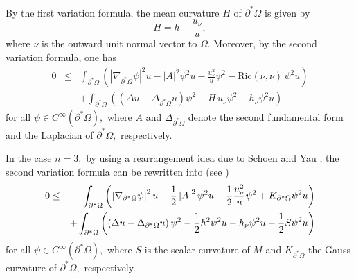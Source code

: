 \documentclass[10pt,a4paper]{amsart}
\numberwithin{equation}{section}
\begin{document}
By the first variation formula,
the mean curvature $H$ of $\partial ^{\ast }\Omega$ is given by
\begin{equation}
H=h-\frac{u_{\nu }}{u},  \label{a2}
\end{equation}
where $\nu$ is the outward unit normal vector to $\Omega.$
Moreover, by the second variation formula, one has
\begin{eqnarray*} 
0 &\leq &\int_{\partial ^{\ast }\Omega }\left( \left\vert \nabla _{\partial ^{\ast }\Omega 
}\psi \right\vert ^{2}u-\left\vert A\right\vert ^{2}\psi ^{2}u-
\frac{u_{\nu }^{2}}{u}\psi ^{2}-\mathrm{Ric}(\nu, \nu)\,\psi
^{2}u\right) \\
&&+\int_{\partial ^{\ast }\Omega }\left( \left( \Delta u-\Delta _{\partial
^{\ast }\Omega }u\right) \psi ^{2}-H\,u_{\nu}\psi ^{2}-h_{\nu }\psi
^{2}u\right)
\end{eqnarray*}
for all $\psi \in C^{\infty }\left( \partial ^{\ast }\Omega \right),$ where 
$A$ and $\Delta _{\partial ^{\ast }\Omega }$ denote the second fundamental form
and the Laplacian of $\partial ^{\ast}\Omega,$ respectively.

In the case $n=3,$ by using a rearrangement idea due to Schoen and Yau \cite{SY}, 
the second variation formula can be rewritten into (see \cite{CL})
\begin{eqnarray}\label{a3}
0 &\leq &\int_{\partial ^{\ast }\Omega }\left( \left\vert \nabla _{\partial ^{\ast }\Omega 
}\psi \right\vert ^{2}u-\frac{1}{2}\left\vert A\right\vert ^{2}\psi ^{2}u-%
\frac{1}{2}\frac{u_{\nu }^{2}}{u}\psi ^{2}+K_{\partial ^{\ast }\Omega }\psi
^{2}u\right) \\
&&+\int_{\partial ^{\ast }\Omega }\left( \left( \Delta u-\Delta _{\partial
^{\ast }\Omega }u\right) \psi ^{2}-\frac{1}{2}h^{2}\psi ^{2}u-h_{\nu }\psi
^{2}u-\frac{1}{2}S\psi ^{2}u\right) \notag
\end{eqnarray}
for all $\psi \in C^{\infty }\left( \partial ^{\ast }\Omega \right),$ where $S$ is the scalar curvature of $M$ and
$K_{\partial^{\ast }\Omega }$ the Gauss curvature of $\partial ^{\ast}\Omega,$ respectively.
\end{document}
